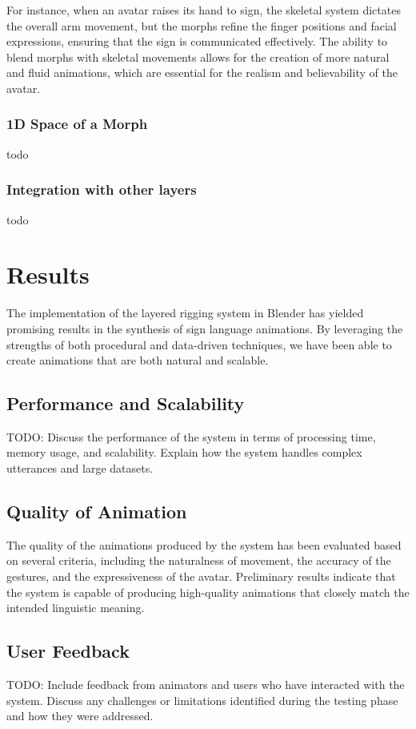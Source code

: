 \documentclass[../../main.tex]{subfiles}
\begin{document}
For instance, when an avatar raises its hand to sign, the skeletal system dictates the overall arm movement, but the morphs refine the finger positions and facial expressions, ensuring that the sign is communicated effectively. The ability to blend morphs with skeletal movements allows for the creation of more natural and fluid animations, which are essential for the realism and believability of the avatar.

\subsubsection{1D Space of a Morph}
todo

\subsubsection{Integration with other layers}
todo

\section{Results}
The implementation of the layered rigging system in Blender has yielded promising results in the synthesis of sign language animations. By leveraging the strengths of both procedural and data-driven techniques, we have been able to create animations that are both natural and scalable.

\subsection{Performance and Scalability}
TODO: Discuss the performance of the system in terms of processing time, memory usage, and scalability. Explain how the system handles complex utterances and large datasets.

\subsection{Quality of Animation}
The quality of the animations produced by the system has been evaluated based on several criteria, including the naturalness of movement, the accuracy of the gestures, and the expressiveness of the avatar. Preliminary results indicate that the system is capable of producing high-quality animations that closely match the intended linguistic meaning.

\subsection{User Feedback}
TODO: Include feedback from animators and users who have interacted with the system. Discuss any challenges or limitations identified during the testing phase and how they were addressed.
\end{document}
